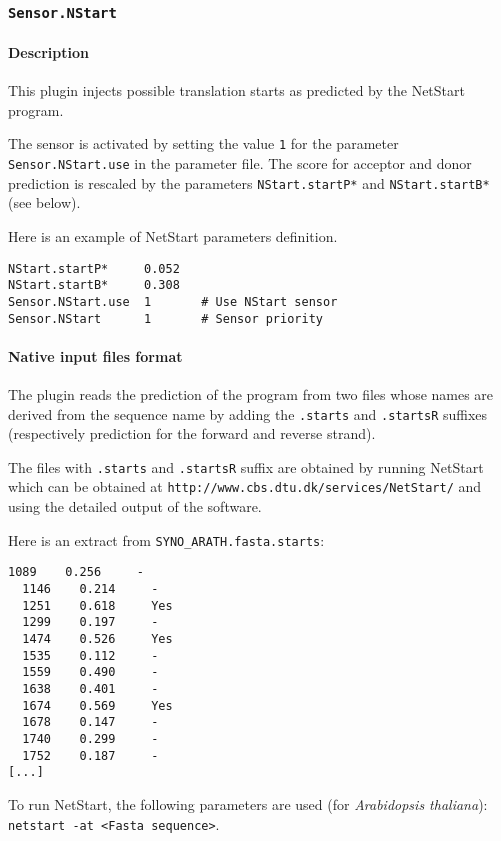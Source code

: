 
\subsubsection{\texttt{Sensor.NStart}}

\paragraph{Description}

This plugin injects possible translation starts as predicted by the
NetStart program. 

The sensor is activated by setting the value \texttt{1} for the parameter
\texttt{Sensor.NStart.use} in the parameter file. The score for acceptor
and donor prediction is rescaled by the parameters {\tt NStart.startP*} and
{\tt NStart.startB*} (see below).

Here is an example of NetStart parameters definition.
\begin{Verbatim}[fontsize=\small]
NStart.startP*     0.052
NStart.startB*     0.308
Sensor.NStart.use  1       # Use NStart sensor
Sensor.NStart      1       # Sensor priority
\end{Verbatim}

\paragraph{Native input files format}
The plugin reads the prediction of the
program from two files whose names are derived from the sequence name
by adding the \texttt{.starts} and \texttt{.startsR} suffixes
(respectively prediction for the forward and reverse strand).

The files with \texttt{.starts} and \texttt{.startsR} suffix are
obtained by running NetStart which can be obtained at
\texttt{http://www.cbs.dtu.dk/services/NetStart/} and using the
detailed output of the software.

Here is an extract from \texttt{SYNO\_ARATH.fasta.starts}:
\begin{Verbatim}[fontsize=\small]
  1089    0.256     -
  1146    0.214     -
  1251    0.618     Yes
  1299    0.197     -
  1474    0.526     Yes
  1535    0.112     -
  1559    0.490     -
  1638    0.401     -
  1674    0.569     Yes
  1678    0.147     -
  1740    0.299     -
  1752    0.187     -
[...]
\end{Verbatim}

To run NetStart, the following parameters are used (for \emph{Arabidopsis
thaliana}): \texttt{netstart -at <Fasta sequence>}.

